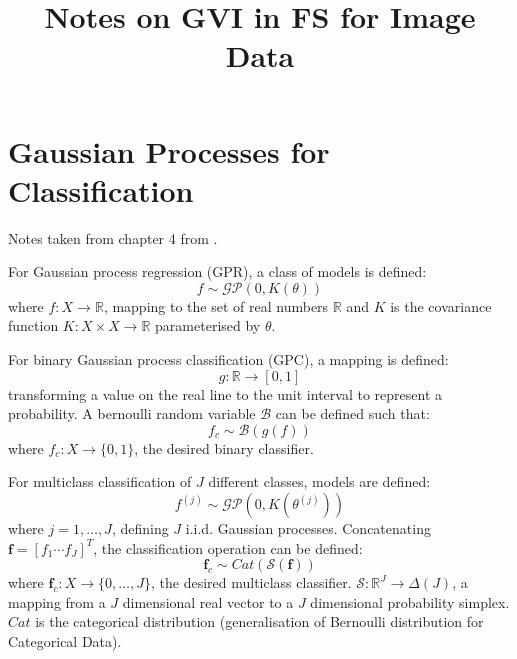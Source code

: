 \documentclass[twoside,11pt]{article}
\begin{document}
\title{Notes on GVI in FS for Image Data}



\maketitle



\section{Gaussian Processes for Classification}\label{sec:gaussian-processes-for-classification}

Notes taken from chapter 4 from \cite{matthews2017scalable}.

For Gaussian process regression (GPR), a class of models is defined:
\[f \sim \mathcal{GP}(0, K(\theta))\]
where $f: X \rightarrow \mathbb{R}$, mapping to the set of real numbers $\mathbb{R}$ and $K$ is the covariance function $K: X \times X \rightarrow \mathbb{R}$ parameterised by $\theta$.

For binary Gaussian process classification (GPC), a mapping is defined:
\[g: \mathbb{R} \rightarrow [0, 1]\]
transforming a value on the real line to the unit interval to represent a probability.
A bernoulli random variable $\mathcal{B}$ can be defined such that:
\[f_c \sim \mathcal{B}(g(f))\]
where $f_c: X \rightarrow \{0, 1\}$, the desired binary classifier.

For multiclass classification of $J$ different classes, models are defined:
\[f^{(j)} \sim \mathcal{GP}(0, K(\theta^{(j)}))\]
where $j=1, \dots, J$, defining $J$ i.i.d. Gaussian processes.
Concatenating $\mathbf{f} = [f_1 \cdots f_J]^T$, the classification operation can be defined:
\[\mathbf{f}_c \sim Cat (\mathcal{S}(\mathbf{f}))\]
where $\mathbf{f}_c: X \rightarrow \{0, \dots, J\}$, the desired multiclass classifier. $\mathcal{S}: \mathbb{R}^J \rightarrow \Delta(J)$, a mapping from a $J$ dimensional real vector to a $J$ dimensional probability simplex. $Cat$ is the categorical distribution (generalisation of Bernoulli distribution for Categorical Data).
\end{document}
